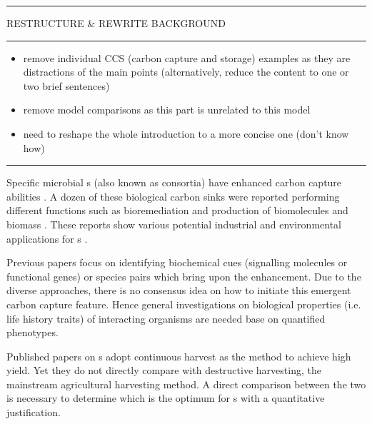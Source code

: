 \documentclass[env.tex]{subfiles}
\begin{document}
\begin{center}\begin{minipage}[H]{.97\linewidth}
\noindent\rule{3.5cm}{1pt}
RESTRUCTURE \& REWRITE BACKGROUND
\noindent\rule{3.5cm}{1pt}
\begin{itemize}
    \item remove individual CCS (carbon capture and storage) examples as they are distractions of the main points (alternatively, reduce the content to one or two brief sentences)
    \item remove model comparisons as this part is unrelated to this model
    \item need to reshape the whole introduction to a more concise one (don't know how)
\end{itemize}\noindent\rule{10cm}{1pt}
\end{minipage}\end{center}

Specific microbial \pbs s (also known as consortia) have enhanced carbon capture abilities \autocite{fuentes2016impact,santos2014microalgal}.  A dozen of these biological carbon sinks were reported performing different functions such as bioremediation \autocite{amin2009photolysis} and production of biomolecules \autocite{seyedsayamdost2011roseobacticides,durham2015cryptic,leyva2014accumulation,choix2012enhanced1,choix2012enhanced2} and biomass \autocite{rivas2010interactions,kazamia2012mutualistic}.  These reports show various potential industrial and environmental applications for \pbs s \autocite{santos2014microalgal}.

Previous papers focus on identifying biochemical cues (signalling molecules or functional genes) \autocite{amin2009photolysis,durham2015cryptic,leyva2014accumulation,rivas2010interactions,seyedsayamdost2011roseobacticides} or species pairs \autocite{choix2012enhanced1,choix2012enhanced2,kazamia2012mutualistic,santos2014microalgal} which bring upon the enhancement.  Due to the diverse approaches, there is no consensus idea on how to initiate this emergent carbon capture feature.  Hence general investigations on biological properties (i.e. life history traits) of interacting organisms are needed base on quantified phenotypes.

Published papers on \pbs s adopt continuous harvest as the method to achieve high yield.  Yet they do not directly compare with destructive harvesting, the mainstream agricultural harvesting method.  A direct comparison between the two is necessary to determine which is the optimum for \pbs s with a quantitative justification.
\end{document}
